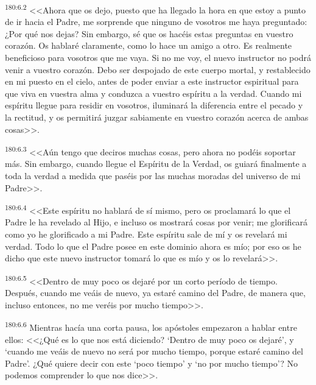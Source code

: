 \par 
\textsuperscript{180:6.2} <<Ahora que os dejo, puesto que ha llegado la hora en que estoy a punto de ir hacia el Padre, me sorprende que ninguno de vosotros me haya preguntado: ¿Por qué nos dejas? Sin embargo, sé que os hacéis estas preguntas en vuestro corazón. Os hablaré claramente, como lo hace un amigo a otro. Es realmente beneficioso para vosotros que me vaya. Si no me voy, el nuevo instructor no podrá venir a vuestro corazón. Debo ser despojado de este cuerpo mortal, y restablecido en mi puesto en el cielo, antes de poder enviar a este instructor espiritual para que viva en vuestra alma y conduzca a vuestro espíritu a la verdad. Cuando mi espíritu llegue para residir en vosotros, iluminará la diferencia entre el pecado y la rectitud, y os permitirá juzgar sabiamente en vuestro corazón acerca de ambas cosas>>.

\par 
\textsuperscript{180:6.3} <<Aún tengo que deciros muchas cosas, pero ahora no podéis soportar más. Sin embargo, cuando llegue el Espíritu de la Verdad, os guiará finalmente a toda la verdad a medida que paséis por las muchas moradas del universo de mi Padre>>.

\par 
\textsuperscript{180:6.4} <<Este espíritu no hablará de sí mismo, pero os proclamará lo que el Padre le ha revelado al Hijo, e incluso os mostrará cosas por venir; me glorificará como yo he glorificado a mi Padre. Este espíritu sale de mí y os revelará mi verdad. Todo lo que el Padre posee en este dominio ahora es mío; por eso os he dicho que este nuevo instructor tomará lo que es mío y os lo revelará>>.

\par 
\textsuperscript{180:6.5} <<Dentro de muy poco os dejaré por un corto período de tiempo. Después, cuando me veáis de nuevo, ya estaré camino del Padre, de manera que, incluso entonces, no me veréis por mucho tiempo>>.

\par 
\textsuperscript{180:6.6} Mientras hacía una corta pausa, los apóstoles empezaron a hablar entre ellos: <<¿Qué es lo que nos está diciendo? `Dentro de muy poco os dejaré', y `cuando me veáis de nuevo no será por mucho tiempo, porque estaré camino del Padre'. ¿Qué quiere decir con este `poco tiempo' y `no por mucho tiempo'? No podemos comprender lo que nos dice>>.

